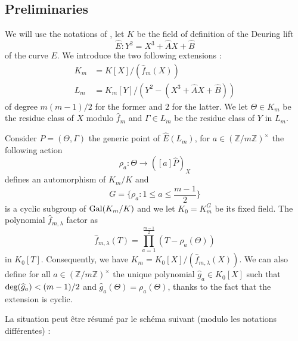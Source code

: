 \documentclass[a4paper]{article} %
\newcommand\zmodninv[1]{(\mathbb{Z}/#1\mathbb{Z})^{\times}}
\begin{document}
\subsection{Preliminaries}
\label{sec:mep}
We will use the notations of \cite{MiMoSch}, let $K$ be the field of definition
of the Deuring lift
\begin{equation}
\widehat{E} : Y^2 = X^3 + \widehat{A}X + \widehat{B}
\end{equation}
of the curve $E$. We introduce the two following extensions : 
\begin{align}
K_m &= K[X]/(\widehat{f}_m(X))\\
L_m &= K_m[Y]/(Y^2 - (X^3 + \widehat{A}X + \widehat{B}))
\end{align}
of degree $m(m-1)/2$ for the former and $2$ for the latter.
We let $\Theta\in K_m$ be the residue class of $X$ modulo $\widehat{f}_m$ and
$\Gamma\in L_m$ be the residue class of $Y$ in $L_m$.\par
Consider $P = (\Theta, \Gamma)$ the generic point of $\widehat{E}(L_m)$, for $a\in 
\zmodninv{m}$ the following action 
\begin{equation}
\rho_a : \Theta \to ([a]\widehat{P})_X
\end{equation}
defines an automorphism of $K_m/K$ and 
\begin{equation}
G = \lbrace{\rho_a : 1 \leq a \leq \dfrac{m-1}{2}}\rbrace
\end{equation}
is a cyclic subgroup of $\textup{Gal}(K_m/K)$ and we let $K_0 = K_m^{G}$ be its
fixed field. The polynomial $\widehat{f}_{m,\lambda}$ factor as 
\begin{equation}
\widehat{f}_{m,\lambda}(T) = \prod_{a=1}^{\tfrac{m-1}{2}}{(T - \rho_a(\Theta))}
\end{equation}
in $K_0[T]$.
Consequently, we have $K_m = K_0[X]/(\widehat{f}_{m,\lambda}(X))$. We can also
define for all $a\in\zmodninv{m}$ the unique polynomial $\widehat{g}_a\in
K_0[X]$ such that $\textup{deg}(\widehat{g}_a) < (m-1)/2$ and $\widehat{g}_a(\Theta) =
\rho_a(\Theta)$, thanks to the fact that the extension is cyclic.

\iffalse
La situation peut être résumé par le schéma suivant (modulo les notations différentes) : 
\end{document}
